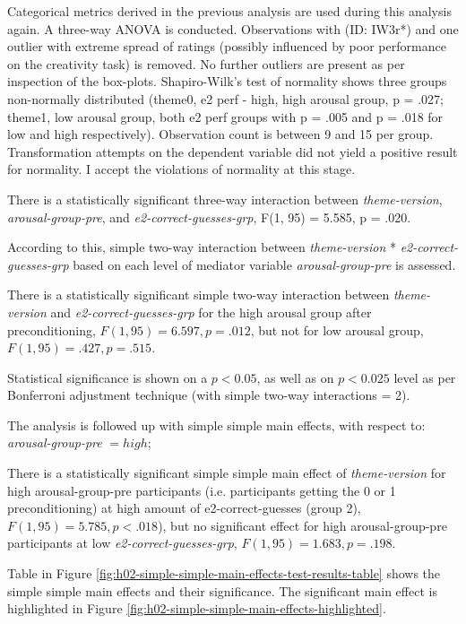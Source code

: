 	Categorical metrics derived in the previous analysis are used during this analysis again. A three-way ANOVA is conducted. Observations with (ID: IW3r*) and one outlier with extreme spread of ratings (possibly influenced by poor performance on the creativity task) is removed. No further outliers are present as per inspection of the box-plots.
	Shapiro-Wilk's test of normality shows three groups non-normally distributed (theme0, e2 perf - high, high arousal group, p = .027; theme1, low arousal group, both e2 perf groups with p = .005 and p = .018 for low and high respectively). Observation count is between 9 and 15 per group. Transformation attempts on the dependent variable did not yield a positive result for normality. I accept the violations of normality at this stage.
			      
	There is a statistically significant three-way interaction between \textit{theme-version}, \textit{arousal-group-pre}, and \textit{e2-correct-guesses-grp}, 
	F(1, 95) = 5.585, p = .020.
	
	According to this, simple two-way interaction between \textit{theme-version} * \textit{e2-correct-guesses-grp} based on each level of mediator variable \textit{arousal-group-pre} is assessed.
	
	There is a statistically significant simple two-way interaction between \textit{theme-version} and \textit{e2-correct-guesses-grp} for the high arousal group after preconditioning, \(F(1, 95) = 6.597, p = .012\), but not for low arousal group, \(F(1, 95) = .427, p = .515\).
	
	Statistical significance is shown on a $ p < 0.05 $, as well as on $ p < 0.025 $ level as per Bonferroni adjustment technique (with simple two-way interactions = 2).
	
	The analysis is followed up with simple simple main effects, with respect to: \textit{arousal-group-pre} $ = high $;
	
	There is a statistically significant simple simple main effect of \textit{theme-version} for high arousal-group-pre participants (i.e. participants getting the 0 or 1 preconditioning) at high amount of e2-correct-guesses (group 2), 
	$ F(1, 95) = 5.785, p < .018 $), 
	but no significant effect for high arousal-group-pre participants at low \textit{e2-correct-guesses-grp}, 
	$ F(1, 95) = 1.683, p = .198 $. 
	
	Table in Figure \ref{fig:h02-simple-simple-main-effects-test-results-table} shows the simple simple main effects and their significance. The significant main effect is highlighted in Figure \ref{fig:h02-simple-simple-main-effects-highlighted}.
	
